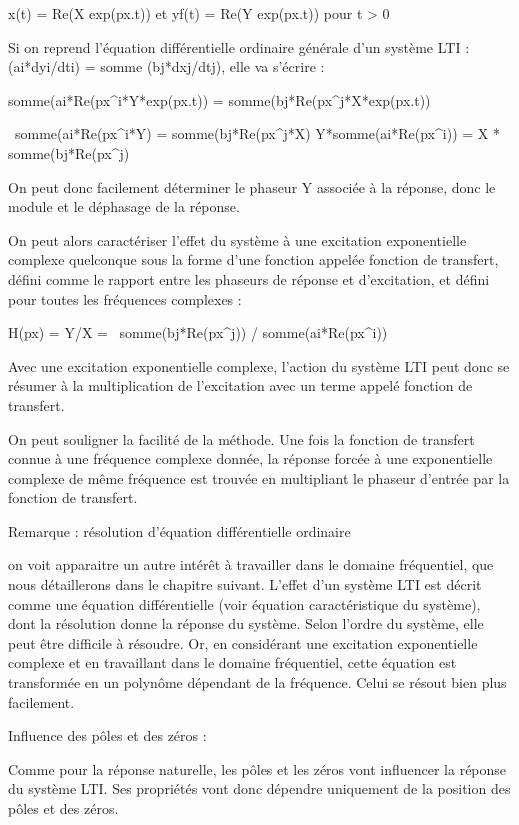 \documentclass[]{article}
\begin{document}
x(t) = Re(X exp(px.t)) et yf(t) = Re(Y exp(px.t)) pour t \textgreater{}
0

Si on reprend l'équation différentielle ordinaire générale d'un système
LTI : (ai*dyi/dti) = somme (bj*dxj/dtj), elle va s'écrire :

somme(ai*Re(px\^{}i*Y*exp(px.t)) = somme(bj*Re(px\^{}j*X*exp(px.t))

~somme(ai*Re(px\^{}i*Y) = somme(bj*Re(px\^{}j*X) Y*somme(ai*Re(px\^{}i))
= X * somme(bj*Re(px\^{}j)~

On peut donc facilement déterminer le phaseur Y associée à la réponse,
donc le module et le déphasage de la réponse.~

On peut alors caractériser l'effet du système à une excitation
exponentielle complexe quelconque sous la forme d'une fonction appelée
fonction de transfert, défini comme le rapport entre les phaseurs de
réponse et d'excitation, et défini pour toutes les fréquences complexes
:

H(px) = Y/X =~ somme(bj*Re(px\^{}j)) / somme(ai*Re(px\^{}i))

Avec une excitation exponentielle complexe, l'action du système LTI peut
donc se résumer à la multiplication de l'excitation avec un terme appelé
fonction de transfert.

On peut souligner la facilité de la méthode. Une fois la fonction de
transfert connue à une fréquence complexe donnée, la réponse forcée à
une exponentielle complexe de même fréquence est trouvée en multipliant
le phaseur d'entrée par la fonction de transfert.

Remarque : résolution d'équation différentielle ordinaire

on voit apparaitre un autre intérêt à travailler dans le domaine
fréquentiel, que nous détaillerons dans le chapitre suivant. L'effet
d'un système LTI est décrit comme une équation différentielle (voir
équation caractéristique du système), dont la résolution donne la
réponse du système. Selon l'ordre du système, elle peut être difficile à
résoudre. Or, en considérant une excitation exponentielle complexe et en
travaillant dans le domaine fréquentiel, cette équation est transformée
en un polynôme dépendant de la fréquence. Celui se résout bien plus
facilement.

Influence des pôles et des zéros :

Comme pour la réponse naturelle, les pôles et les zéros vont influencer
la réponse du système LTI. Ses propriétés vont donc dépendre uniquement
de la position des pôles et des zéros.
\end{document}
